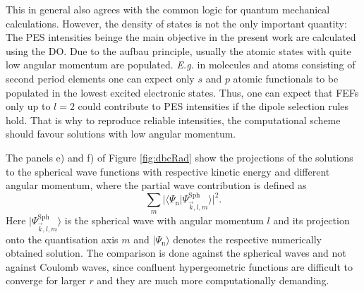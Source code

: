 This in general also agrees with the common logic for quantum mechanical calculations.
However, the density of states is not the only important quantity: The PES intensities beinge the main objective in the present work are calculated using the DO.
Due to the aufbau principle, usually the atomic states with quite low angular momentum are populated.
\textit{E.g.} in molecules and atoms consisting of second period elements one can expect only $s$ and $p$ atomic functionals to be populated in the lowest excited electronic states. 
Thus, one can expect that FEFs only up to $l=2$ could contribute to PES intensities if the dipole selection rules hold.
That is why to reproduce reliable intensities, the computational scheme should favour solutions with low angular momentum.

The panels e) and f) of Figure \ref{fig:dbcRad} show the projections of the solutions to the spherical wave functions with respective kinetic energy and different angular momentum, where the partial wave contribution is defined as
\begin{equation} \label{eq:PartWaveCoeff}
\sum_m|\langle \Psi_\text{n} | \Psi_{\vec{k},l,m}^\text{Sph}\rangle |^2.
\end{equation}
Here $|\Psi_{\vec{k},l,m}^\text{Sph}\rangle$ is the spherical wave  with angular momentum $l$ and its projection onto the quantisation axis $m$ and $|\Psi_\text{n}\rangle$ denotes the respective numerically obtained solution.
The comparison is done against the spherical waves and not against Coulomb waves, since confluent hypergeometric functions are difficult to converge for larger $r$ and they are much more computationally demanding.

